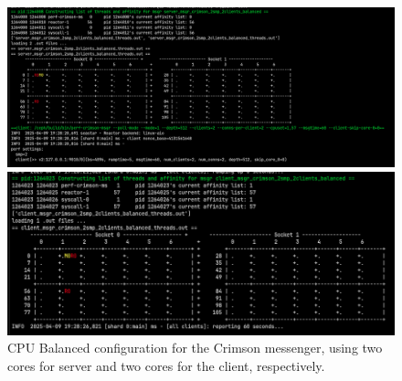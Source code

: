 \begin{figure}[!ht]
  \centering
  \begin{minipage}{.5\textwidth}
  \centering
    \includegraphics[width=\textwidth]{server_msgr_crimson_2smp_2clients_balanced.png}
  \end{minipage}%
  \begin{minipage}{.5\textwidth}
  \centering
    \includegraphics[width=\textwidth]{client_msgr_crimson_2smp_2clients_balanced.png}
  \end{minipage}%
  \caption{CPU Balanced configuration for the Crimson messenger, using two
  cores for server and two cores for the client, respectively.}
  \label{figure:crimson_bal_2}
\end{figure}

